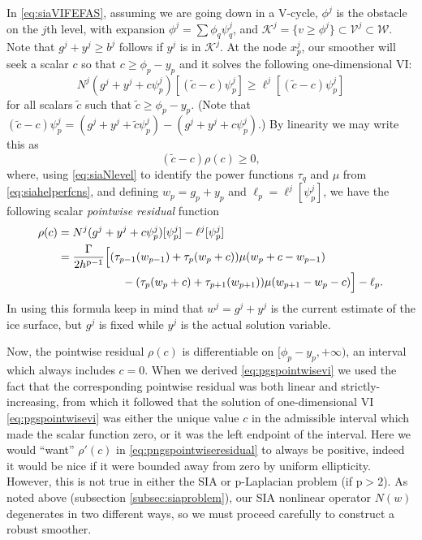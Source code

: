 \documentclass[letterpaper,final,12pt,reqno]{amsart}
\theoremstyle{claim}
\newcommand{\pp}{{\text{p}}}
\numberwithin{equation}{section}
\numberwithin{figure}{section}
\numberwithin{table}{section}
\numberwithin{theorem}{section}
\begin{document}
In \eqref{eq:siaVIFEFAS}, assuming we are going down in a V-cycle, $\phi^j$ is the obstacle on the $j$th level, with expansion $\phi^j = \sum \phi_q \psi_q^j$, and $\mathcal{K}^j = \{v \ge \phi^j\} \subset \mathcal{V}^j \subset \mathcal{W}$.  Note that $g^j+y^j \ge b^j$ follows if $y^j$ is in $\mathcal{K}^j$.  At the node $x_p^j$, our smoother will seek a scalar $c$ so that $c \ge \phi_p - y_p$ and it solves the following one-dimensional VI:
\begin{equation}
N^j(g^j+y^j+c\psi_p^j)[(\tilde c - c) \psi_p^j] \ge \ell^j[(\tilde c - c) \psi_p^j] \label{eq:pngspointwiseviEARLY}
\end{equation}
for all scalars $\tilde c$ such that $\tilde c \ge \phi_p - y_p$.
(Note that $(\tilde c - c) \psi_p^j = (g^j+y^j+\tilde c\psi_p^j) - (g^j+y^j+c\psi_p^j)$.)  By linearity we may write this as
\begin{equation}
  (\tilde c - c) \rho(c) \ge 0,  \label{eq:pngspointwisevi}
\end{equation}
where, using \eqref{eq:siaNlevel} to identify the power functions $\tau_q$ and $\mu$ from \eqref{eq:siahelperfcns}, and defining $w_p=g_p+y_p$ and $\ell_p=\ell^j[\psi_p^j]$, we have the following scalar \emph{pointwise residual} function
\begin{align}
  \rho(c) &= N^j(g^j+y^j+c\psi_p^j)[\psi_p^j] - \ell^j[\psi_p^j] \label{eq:pngspointwiseresidual} \\
       &= \frac{\Gamma}{2h^{\pp-1}} \Big[(\tau_{p-1}(w_{p-1}) + \tau_p(w_p +c)) \mu(w_p+c-w_{p-1}) \notag  \\
       &\hspace{20mm} - (\tau_p(w_p+c) + \tau_{p+1}(w_{p+1})) \mu(w_{p+1}-w_p-c)\Big] - \ell_p. \notag
\end{align}
In using this formula keep in mind that $w^j = g^j+y^j$ is the current estimate of the ice surface, but $g^j$ is fixed while $y^j$ is the actual solution variable.

Now, the pointwise residual $\rho(c)$ is differentiable on $[\phi_p - y_p,+\infty)$, an interval which always includes $c=0$.  When we derived \eqref{eq:pgspointwisevi} we used the fact that the corresponding pointwise residual was both linear and strictly-increasing, from which it followed that the solution of one-dimensional VI \eqref{eq:pgspointwisevi} was either the unique value $c$ in the admissible interval which made the scalar function zero, or it was the left endpoint of the interval.  Here we would ``want'' $\rho'(c)$ in \eqref{eq:pngspointwiseresidual} to always be positive, indeed it would be nice if it were bounded away from zero by uniform ellipticity.  However, this is not true in either the SIA or $\pp$-Laplacian problem (if $\pp>2$).  As noted above (subsection \ref{subsec:siaproblem}), our SIA nonlinear operator $N(w)$ degenerates in two different ways, so we must proceed carefully to construct a robust smoother.
\end{document}

